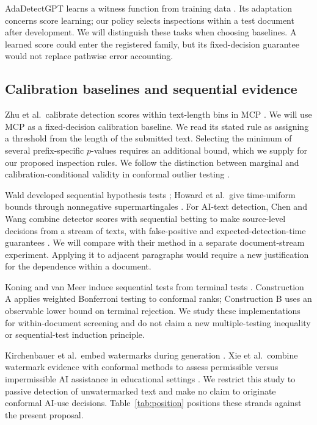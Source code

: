 \documentclass[pdflatex,sn-mathphys-num]{sn-jnl}
\begin{document}
AdaDetectGPT learns a witness function from training data \citep{zhou2025adadetect}. Its adaptation concerns score learning; our policy selects inspections within a test document after development. We will distinguish these tasks when choosing baselines. A learned score could enter the registered family, but its fixed-decision guarantee would not replace pathwise error accounting.

\subsection{Calibration baselines and sequential evidence}

Zhu et al.\ calibrate detection scores within text-length bins in MCP \citep{zhu2025}. We will use MCP as a fixed-decision calibration baseline. We read its stated rule as assigning a threshold from the length of the submitted text. Selecting the minimum of several prefix-specific \(p\)-values requires an additional bound, which we supply for our proposed inspection rules. We follow the distinction between marginal and calibration-conditional validity in conformal outlier testing \citep{bates2023}.

Wald developed sequential hypothesis tests \citep{wald1945}; Howard et al.\ give time-uniform bounds through nonnegative supermartingales \citep{howard2020}. For AI-text detection, Chen and Wang combine detector scores with sequential betting to make source-level decisions from a stream of texts, with false-positive and expected-detection-time guarantees \citep{chen2025}. We will compare with their method in a separate document-stream experiment. Applying it to adjacent paragraphs would require a new justification for the dependence within a document.

Koning and van Meer induce sequential tests from terminal tests \citep{koning2026anytime}. Construction A applies weighted Bonferroni testing to conformal ranks; Construction B uses an observable lower bound on terminal rejection. We study these implementations for within-document screening and do not claim a new multiple-testing inequality or sequential-test induction principle.

Kirchenbauer et al.\ embed watermarks during generation \citep{kirchenbauer2023}. Xie et al.\ combine watermark evidence with conformal methods to assess permissible versus impermissible AI assistance in educational settings \citep{xie2026}. We restrict this study to passive detection of unwatermarked text and make no claim to originate conformal AI-use decisions. Table~\ref{tab:position} positions these strands against the present proposal.
\end{document}
